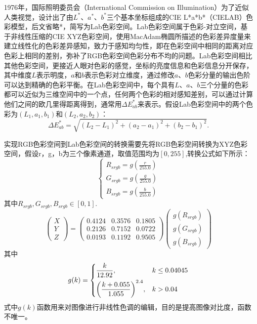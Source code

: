 \documentclass[UTF8,a4paper,twoside]{ctexart}
\begin{document}
1976年，国际照明委员会（International Commission on Illumination）为了近似人类视觉，设计出了由$L^*$、$a^*$、$b^*$三个基本坐标组成的CIE L*a*b*（CIELAB）色彩模型，后文省略*，简写为Lab色彩空间。Lab色彩空间属于色彩-对立空间，基于非线性压缩的CIE XYZ色彩空间，使用MacAdam椭圆所描述的色彩差异度量来建立线性化的色彩差异感知，致力于感知均匀性，即在色彩空间中相同的距离对应色彩上相同的差别，弥补了RGB色彩空间色彩分布不均的问题。Lab色彩空间相比其他色彩空间，更接近人眼对色彩的感觉，坐标的亮度信息和色彩信息分开保存，其中维度$L$表示明度，$a$和$b$表示色彩对立维度，通过修改$a$、$b$色彩分量的输出色阶可以达到精确的色彩平衡。在Lab色彩空间中，每个具有$L$、$a$、$b$三个分量的色彩都可以近似为三维空间中的一个点，任何两个色彩的相对感知差别，可以通过计算他们之间的欧几里得距离得到，通常用$\Delta E_{ab}^*$来表示。假设Lab色彩空间中的两个色彩为$(L_1,a_1,b_1)$和$(L_2,a_2,b_2)$：
\begin{equation}
  \Delta E_{ab}^* = \sqrt{(L_2 - L_1)^2 + (a_2 - a_1)^2 + (b_2 - b_1)^2}.
\end{equation}

实现RGB色彩空间到Lab色彩空间的转换需要先将RGB色彩空间转换为XYZ色彩空间，假设r，g，b为三个像素通道，取值范围均为$[0,255]$,转换公式如下所示：
\begin{equation}
  \left\{
    \begin{gathered}
      R_{srgb} = g(\frac{r}{255.0}) \\
      G_{srgb} = g(\frac{g}{255.0}) \\
      B_{srgb} = g(\frac{b}{255.0})
    \end{gathered}
  \right.
\end{equation}
其中$R_{srgb},G_{srgb},B_{srgb} \in [0,1]$.
\begin{equation}
  \begin{pmatrix}
    X \\ Y \\ Z
  \end{pmatrix} =
  \begin{pmatrix}
    0.4124 & 0.3576 & 0.1805 \\
    0.2126 & 0.7152 & 0.0722 \\
    0.0193 & 0.1192 & 0.9505
  \end{pmatrix}
  \begin{pmatrix}
    g(R_{srgb}) \\
    g(G_{srgb}) \\
    g(B_{srgb})
  \end{pmatrix}
\end{equation}
其中
\begin{equation}
  g(k) =
  \begin{dcases}
    \frac{k}{12.92}, & k \leq 0.04045 \\
    {\left(\frac{k+0.055}{1.055}\right)}^{2.4}, & k > 0.04
  \end{dcases}
\end{equation}
式中$g(k)$函数用来对图像进行非线性色调的编辑，目的是提高图像对比度，函数不唯一。
\end{document}

